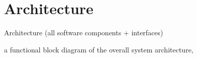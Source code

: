 \documentclass[final]{article}
\begin{document}
\section{Architecture}
Architecture (all software components + interfaces)

a functional block diagram of the overall system architecture,
\end{document}
